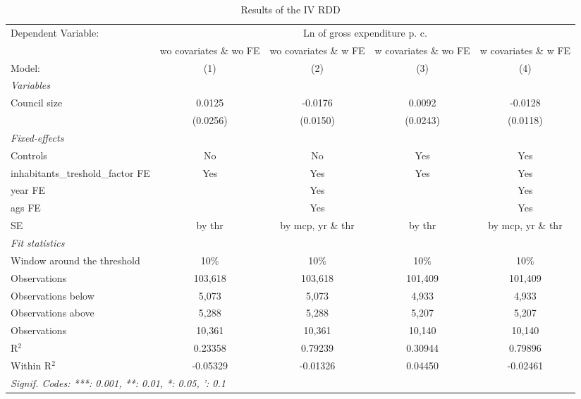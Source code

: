 
\begin{table}[htbp]
   \caption{\label{tab:rdd_iv} Results of the \acs{IV} \acs{RDD}}
   \centering
   \begin{tabular}{lcccc}
      \tabularnewline \midrule \midrule
      Dependent Variable: & \multicolumn{4}{c}{Ln of gross expenditure p. c.}\\
       & \acs{wo} covariates \& \acs{wo} \ac{FE} & \acs{wo} covariates \& \acs{w} \ac{FE} & \acs{w} covariates \& \acs{wo} \ac{FE} & \acs{w} covariates \& \acs{w} \ac{FE} \\ 
      Model:                                   & (1)      & (2)      & (3)      & (4)\\  
      \midrule
      \emph{Variables}\\
      Council size                             & 0.0125   & -0.0176  & 0.0092   & -0.0128\\   
                                               & (0.0256) & (0.0150) & (0.0243) & (0.0118)\\   
      \midrule
      \emph{Fixed-effects}\\
      Controls                                 & No       & No       & Yes      & Yes\\  
      inhabitants\_treshold\_factor \ac{FE}    & Yes      & Yes      & Yes      & Yes\\  
      year \ac{FE}                             &          & Yes      &          & Yes\\  
      ags \ac{FE}                              &          & Yes      &          & Yes\\  
      \acs{SE} & by \acs{thr} & by \acs{mcp}, \acs{yr} \& \acs{thr} & by \acs{thr} & by \acs{mcp}, \acs{yr} \& \acs{thr}\\
      \midrule
      \emph{Fit statistics}\\
      Window around the threshold              & 10\%     & 10\%     & 10\%     & 10\%\\   
      Observations                             & 103,618  & 103,618  & 101,409  & 101,409\\  
      Observations below                       & 5,073    & 5,073    & 4,933    & 4,933\\  
      Observations above                       & 5,288    & 5,288    & 5,207    & 5,207\\  
      Observations                             & 10,361   & 10,361   & 10,140   & 10,140\\  
      R$^2$                                    & 0.23358  & 0.79239  & 0.30944  & 0.79896\\  
      Within R$^2$                             & -0.05329 & -0.01326 & 0.04450  & -0.02461\\  
      \midrule \midrule
      \multicolumn{5}{l}{\emph{Signif. Codes: ***: 0.001, **: 0.01, *: 0.05, ': 0.1}}\\
   \end{tabular}
   

\end{table}
